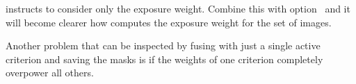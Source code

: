 instructs \App{} to consider only the exposure weight.  Combine this with
option~ and it will become clearer how \App{} computes the exposure weight
for the set of images.

%
%
Another problem that can be inspected by fusing with just a single active criterion and saving
the masks is if the weights of one criterion completely overpower all others.








